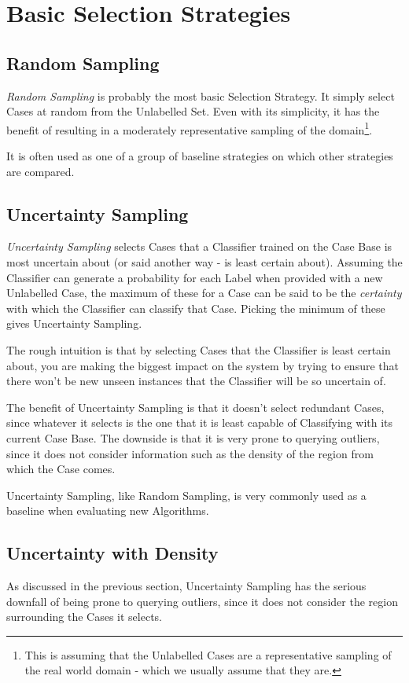 \documentclass[a4paper,11pt]{report}
\begin{document}
\section{Basic Selection Strategies}
\subsection{Random Sampling}
\emph{Random Sampling} is probably the most basic Selection Strategy. It simply select Cases at random from the Unlabelled Set. Even with its simplicity, it has the benefit of resulting in a moderately representative sampling of the domain\footnote{This is assuming that the Unlabelled Cases are a representative sampling of the real world domain - which we usually assume that they are.}.

It is often used as one of a group of baseline strategies on which other strategies are compared.

\subsection{Uncertainty Sampling}
\emph{Uncertainty Sampling}\cite{Lewis1994} selects Cases that a Classifier trained on the Case Base is most uncertain about (or said another way - is least certain about). Assuming the Classifier can generate a probability for each Label when provided with a new Unlabelled Case, the maximum of these for a Case can be said to be the \emph{certainty} with which the Classifier can classify that Case. Picking the minimum of these gives Uncertainty Sampling.

The rough intuition is that by selecting Cases that the Classifier is least certain about, you are making the biggest impact on the system by trying to ensure that there won't be new unseen instances that the Classifier will be so uncertain of.

The benefit of Uncertainty Sampling is that it doesn't select redundant Cases, since whatever it selects is the one that it is least capable of Classifying with its current Case Base. The downside is that it is very prone to querying outliers, since it does not consider information such as the density of the region from which the Case comes.

Uncertainty Sampling, like Random Sampling, is very commonly used as a baseline when evaluating new Algorithms.

\subsection{Uncertainty with Density}
As discussed in the previous section, Uncertainty Sampling has the serious downfall of being prone to querying outliers, since it does not consider the region surrounding the Cases it selects.
\end{document}
